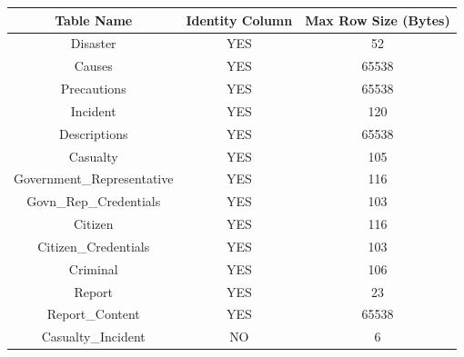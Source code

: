\begin{tabular}{||c | c | c||} 
 \hline
 Table Name & Identity Column & Max Row Size (Bytes) \\ [0.5ex] 
 \hline\hline
 Disaster & YES & 52 \\ 
 \hline
 Causes & YES & 65538 \\ 
 \hline
 Precautions & YES & 65538 \\ 
 \hline
 Incident & YES & 120 \\ 
 \hline
 Descriptions & YES & 65538 \\ 
 \hline
 Casualty & YES & 105 \\ 
 \hline
 Government\_Representative & YES & 116 \\ 
 \hline
 Govn\_Rep\_Credentials & YES & 103 \\ 
 \hline
 Citizen & YES & 116 \\ 
 \hline
 Citizen\_Credentials & YES & 103 \\ 
 \hline
 Criminal & YES & 106 \\ 
 \hline
 Report & YES & 23 \\ 
 \hline
 Report\_Content & YES & 65538 \\ 
 \hline
 Casualty\_Incident & NO & 6 \\ [1ex] 
 \hline
\end{tabular}

